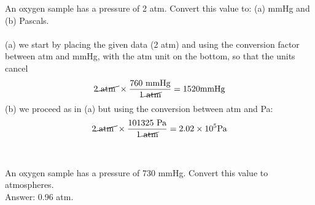 \documentclass[main.tex]{subfiles}
\newcommand\chapterlabel{Ch-Gas}\setcounter{figurenewcounter}{0}\setcounter{tablenewcounter}{0}\setcounter{formulanewcounter}{0}
\begin{document}
\begin{description}
\begin{example} %
An oxygen sample has a pressure of 2 atm. Convert this value to: (a) mmHg and (b) Pascals.
\\
\\
(a) we start by placing the given data (2 atm) and using the conversion factor between atm and mmHg, with the atm unit on the bottom, so that the units cancel
\begin{equation*}
2   \cancel{\text{ atm }} \times
\dfrac{760\text{ mmHg}  } {1\cancel{\text{ atm}}}=1520\text{mmHg}
\end{equation*}
(b) we proceed as in (a) but using the conversion between atm and Pa:
\begin{equation*}
2   \cancel{\text{ atm }} \times
\dfrac{101325\text{ Pa}  } {1\cancel{\text{ atm}}}=2.02\times 10^{5}\text{Pa}
\end{equation*}
\\
\faDiamond\ \\
An oxygen sample has a pressure of 730 mmHg. Convert this value to atmospheres.
\\
\flushright Answer: 0.96 atm.
\end{example}%

     \label{Fig:{\chapterlabel}\thefigurenewcounter} \hspace{0cm}\begin{minipage}[b]{1.0\linewidth}
\end{minipage}
\end{description}
\end{document}

